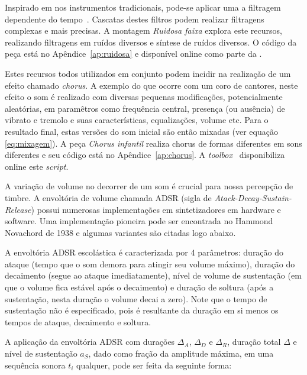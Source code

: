 Inspirado em nos instrumentos tradicionais, pode-se aplicar uma a filtragem dependente do tempo~\cite{Roederer}.
Cascatas
destes filtros podem realizar filtragens complexas e mais precisas. A montagem \emph{Ruidosa faixa} explora
este recursos, realizando filtragens em ruídos diversos e síntese de ruídos diversos. O código da peça está no Apêndice~\ref{ap:ruidosa} e disponível online como parte da \massa.

Estes recursos todos utilizados em conjunto podem incidir na realização de um efeito chamado \emph{chorus}. A
exemplo do que ocorre com um coro de cantores, neste efeito o som é realizado com diversas pequenas modificações,
potencialmente aleatórias, em paramêtros como frequência central, presença (ou ausência) de vibrato
e tremolo e suas características, equalizações, volume etc. Para o resultado final, estas versões do som
inicial são então mixadas (ver equação \ref{eq:mixagem}). A peça \emph{Chorus infantil} realiza chorus de formas
diferentes em sons diferentes e seu código está no Apêndice~\ref{ap:chorus}. A \emph{toolbox} \massa\ disponibiliza online este \emph{script}.

A variação de volume no decorrer de um som é crucial para nossa percepção de timbre. A envoltória de volume chamada ADSR (sigla de \emph{Atack-Decay-Sustain-Release}) possui numerosas implementações em sintetizadores em hardware e software. Uma implementação pioneira pode ser encontrada no Hammond Novachord de 1938 e algumas variantes são citadas logo abaixo.\cite{ADSR}

A envoltória ADSR escolástica é caracterizada por 4 parâmetros: duração do ataque (tempo que o som demora para atingir seu volume máximo), duração do decaimento (segue ao ataque imediatamente), nível de volume de sustentação (em que o volume fica estável após o decaimento) e duração de soltura (após a sustentação, nesta duração o volume decai a zero).
Note que o tempo de sustentação não é especificado, pois é resultante da duração em si menos os tempos de ataque, decaimento e soltura.

A aplicação da envoltória ADSR com durações $\Delta_A$, $\Delta_D$ e $\Delta_R$, duração total $\Delta$ e nível de sustentação $a_S$, dado
como fração da amplitude máxima, em uma sequência sonora $t_i$ qualquer, pode ser feita da seguinte forma:

